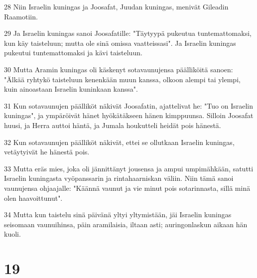 \par 28 Niin Israelin kuningas ja Joosafat, Juudan kuningas, menivät Gileadin Raamotiin.
\par 29 Ja Israelin kuningas sanoi Joosafatille: "Täytyypä pukeutua tuntemattomaksi, kun käy taisteluun; mutta ole sinä omissa vaatteissasi". Ja Israelin kuningas pukeutui tuntemattomaksi ja kävi taisteluun.
\par 30 Mutta Aramin kuningas oli käskenyt sotavaunujensa päälliköitä sanoen: "Älkää ryhtykö taisteluun kenenkään muun kanssa, olkoon alempi tai ylempi, kuin ainoastaan Israelin kuninkaan kanssa".
\par 31 Kun sotavaunujen päälliköt näkivät Joosafatin, ajattelivat he: "Tuo on Israelin kuningas", ja ympäröivät hänet hyökätäkseen hänen kimppuunsa. Silloin Joosafat huusi, ja Herra auttoi häntä, ja Jumala houkutteli heidät pois hänestä.
\par 32 Kun sotavaunujen päälliköt näkivät, ettei se ollutkaan Israelin kuningas, vetäytyivät he hänestä pois.
\par 33 Mutta eräs mies, joka oli jännittänyt jousensa ja ampui umpimähkään, satutti Israelin kuningasta vyöpanssarin ja rintahaarniskan väliin. Niin tämä sanoi vaunujensa ohjaajalle: "Käännä vaunut ja vie minut pois sotarinnasta, sillä minä olen haavoittunut".
\par 34 Mutta kun taistelu sinä päivänä yltyi yltymistään, jäi Israelin kuningas seisomaan vaunuihinsa, päin aramilaisia, iltaan asti; auringonlaskun aikaan hän kuoli.

\chapter{19}

